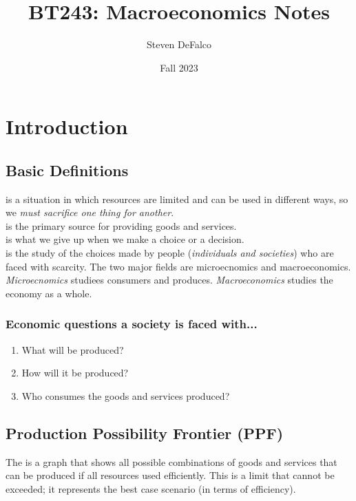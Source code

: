 \documentclass{article}
\title{BT243: Macroeconomics Notes}
\author{Steven DeFalco}
\date{Fall 2023}
\begin{document}
\maketitle
\tableofcontents
\newpage



\section{Introduction}

\subsection{Basic Definitions}

 is a situation in which resources are limited and can be used in different ways, so we \emph{must sacrifice one thing for another}. \\ 

 is the primary source for providing goods and services. \\

 is what we give up when we make a choice or a decision. \\

 is the study of the choices made by people (\emph{individuals and societies}) who are faced with scarcity. The two major fields are microecnomics and macroeconomics. \emph{Microecnomics} studiees consumers and produces. \emph{Macroeconomics} studies the economy as a whole. \\ 

\subsubsection{Economic questions a society is faced with...}

\begin{enumerate}
  \item What will be produced? 
  \item How will it be produced?
  \item Who consumes the goods and services produced?
\end{enumerate}

\subsection{Production Possibility Frontier (PPF)}

The  is a graph that shows all possible combinations of goods and services that can be produced if all resources used efficiently. This is a limit that cannot be exceeded; it represents the best case scenario (in terms of efficiency). 
\end{document}
